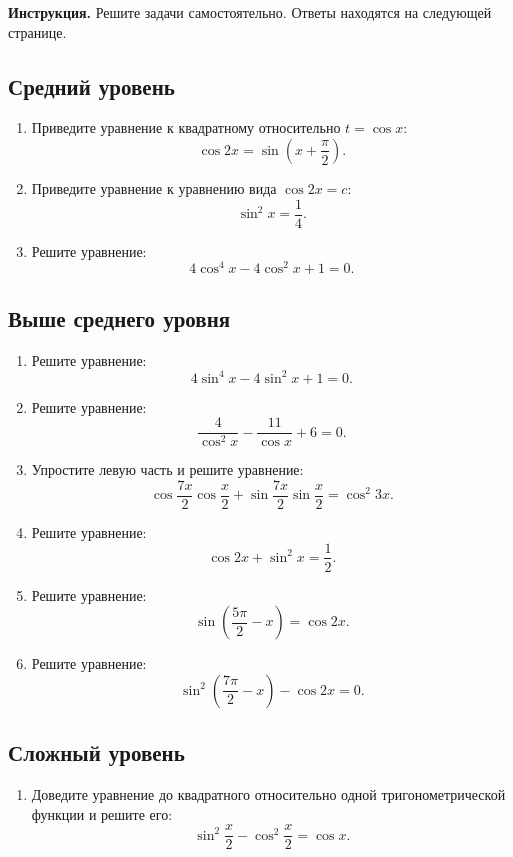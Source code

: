 \documentclass[a4paper,12pt]{article}
\begin{document}
\textbf{Инструкция.} Решите задачи самостоятельно. Ответы находятся на следующей странице.

\subsection*{Средний уровень}

\begin{enumerate}
\item Приведите уравнение к квадратному относительно \(t=\cos x\):
\[
\cos2x=\sin\left(x+\frac{\pi}{2}\right).
\]

\item Приведите уравнение к уравнению вида \(\cos2x=c\):
\[
\sin^2x=\frac14.
\]

\item Решите уравнение:
\[
4\cos^4x-4\cos^2x+1=0.
\]
\end{enumerate}

\subsection*{Выше среднего уровня}

\begin{enumerate}[resume]
\item Решите уравнение:
\[
4\sin^4x-4\sin^2x+1=0.
\]

\item Решите уравнение:
\[
\frac{4}{\cos^2x}-\frac{11}{\cos x}+6=0.
\]

\item Упростите левую часть и решите уравнение:
\[
\cos\frac{7x}{2}\cos\frac{x}{2}+\sin\frac{7x}{2}\sin\frac{x}{2}
=
\cos^2 3x.
\]

\item Решите уравнение:
\[
\cos2x+\sin^2x=\frac12.
\]

\item Решите уравнение:
\[
\sin\left(\frac{5\pi}{2}-x\right)=\cos2x.
\]

\item Решите уравнение:
\[
\sin^2\left(\frac{7\pi}{2}-x\right)-\cos2x=0.
\]
\end{enumerate}

\subsection*{Сложный уровень}

\begin{enumerate}[resume]
\item Доведите уравнение до квадратного относительно одной тригонометрической функции и решите его:
\[
\sin^2\frac{x}{2}-\cos^2\frac{x}{2}=\cos x.
\]
\end{enumerate}
\end{document}
